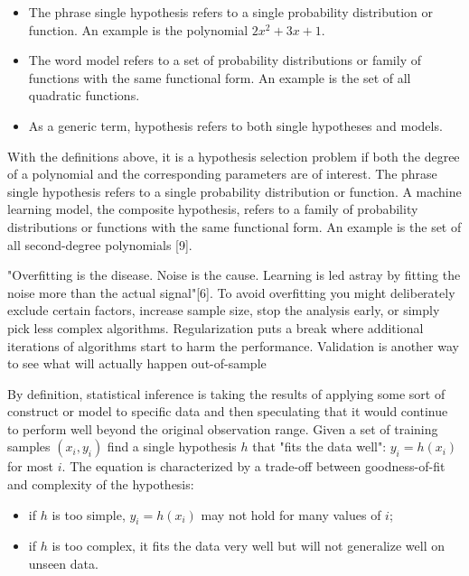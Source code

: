 \begin{itemize}
\item The phrase single hypothesis refers to a single probability distribution or function. An example is the polynomial \(2x^2 + 3x + 1\).

\item The word model refers to a set of probability distributions or family of functions with the same functional form. An example is the set of all quadratic functions.

\item As a generic term, hypothesis refers to both single hypotheses and models.
\end{itemize}

With the deﬁnitions above, it is a hypothesis selection problem if both the degree of a polynomial and the corresponding parameters are of interest. The phrase single hypothesis refers to a single probability distribution or function. A machine learning model, the composite hypothesis, refers to a family of probability distributions or functions with the same functional form. An example is the set of all second-degree polynomials [9].


"Overﬁtting is the disease. Noise is the cause. Learning is led astray by ﬁtting the noise more than the actual signal"[6]. To avoid overﬁtting you might deliberately exclude certain factors, increase sample size, stop the analysis early, or simply pick less complex algorithms. Regularization puts a break where additional iterations of algorithms start to harm the performance. Validation is another way to see what will actually happen out-of-sample

By deﬁnition, statistical inference is taking the results of applying some sort of construct or model to speciﬁc data and then speculating that it would continue to perform well beyond the original observation range. Given a set of training samples \((x_i,y_i)\) ﬁnd a single hypothesis \(h\) that "fits the data well": \(y_i = h(x_i)\) for most \(i\). The equation is characterized by a trade-off between goodness-of-ﬁt and complexity of the hypothesis:

\begin{itemize}
\item if \(h\) is too simple, \(y_i = h(x_i)\) may not hold for many values of \(i\);
\item if \(h\) is too complex, it fits the data very well but will not generalize well on unseen data.
\end{itemize}


